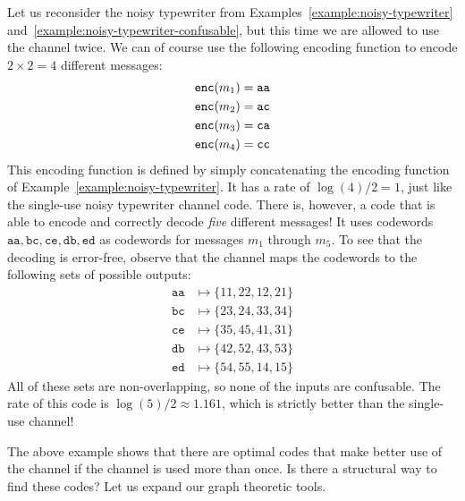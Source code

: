 \begin{example}\label{example:typewriter-multiple-uses}
Let us reconsider the noisy typewriter from Examples~\ref{example:noisy-typewriter} and~\ref{example:noisy-typewriter-confusable}, but this time we are allowed to use the channel twice. We can of course use the following encoding function to encode $2 \times 2 = 4$ different messages:
\begin{align*}
\mathtt{enc}(m_1) &= \mathtt{aa}\\
\mathtt{enc}(m_2) &= \mathtt{ac}\\
\mathtt{enc}(m_3) &= \mathtt{ca}\\
\mathtt{enc}(m_4) &= \mathtt{cc}\\
\end{align*}
This encoding function is defined by simply concatenating the encoding function of Example~\ref{example:noisy-typewriter}. It has a rate of $\log(4) / 2 = 1$, just like the single-use noisy typewriter channel code. There is, however, a code that is able to encode and correctly decode \emph{five} different messages! It uses codewords $\mathtt{aa}, \mathtt{bc}, \mathtt{ce}, \mathtt{db}, \mathtt{ed}$ as codewords for messages $m_1$ through $m_5$. To see that the decoding is error-free, observe that the channel maps the codewords to the following sets of possible outputs:
\begin{align*}
\mathtt{aa} &\mapsto \{11, 22, 12, 21\}\\ 
\mathtt{bc} &\mapsto \{23, 24, 33, 34\}\\
\mathtt{ce} &\mapsto \{35, 45, 41, 31\}\\
\mathtt{db} &\mapsto \{42, 52, 43, 53\}\\
\mathtt{ed} &\mapsto \{54, 55, 14, 15\} 
\end{align*}
All of these sets are non-overlapping, so none of the inputs are confusable. The rate of this code is $\log(5) / 2 \approx 1.161$, which is strictly better than the single-use channel!
\end{example}

The above example shows that there are optimal codes that make better use of the channel if the channel is used more than once. Is there a structural way to find these codes? Let us expand our graph theoretic tools.

